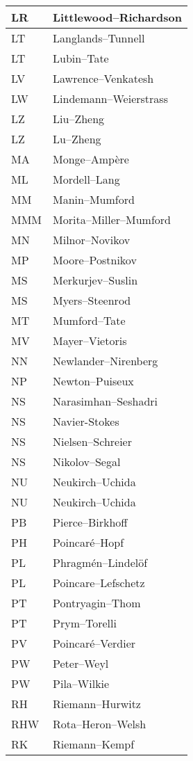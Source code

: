 \documentclass{amsart}
\numberwithin{equation}{section}
\theoremstyle{plain}
\numberwithin{equation}{section}
\theoremstyle{remark}
\begin{document}
\begin{multicols}{2}
{\begin{longtable}{l|l}
LR & Littlewood--Richardson\\ \hline
LT & Langlands--Tunnell\\ \hline
LT & Lubin--Tate\\ \hline
LV & Lawrence--Venkatesh\\ \hline
LW & Lindemann--Weierstrass\\ \hline
LZ & Liu--Zheng\\ \hline
LZ & Lu--Zheng\\ \hline
MA & Monge--Ampère\\ \hline
ML & Mordell--Lang\\ \hline
MM & Manin--Mumford\\ \hline
MMM & Morita--Miller--Mumford\\ \hline
MN & Milnor--Novikov\\ \hline
MP & Moore--Postnikov\\ \hline
MS & Merkurjev--Suslin\\ \hline
MS & Myers--Steenrod\\ \hline
MT & Mumford--Tate\\ \hline
MV & Mayer--Vietoris\\ \hline
NN & Newlander--Nirenberg\\ \hline
NP & Newton--Puiseux\\ \hline
NS & Narasimhan--Seshadri\\ \hline
NS & Navier-Stokes\\ \hline
NS & Nielsen--Schreier\\ \hline
NS & Nikolov--Segal\\ \hline
NU & Neukirch--Uchida\\ \hline
NU & Neukirch--Uchida\\ \hline
PB & Pierce--Birkhoff\\ \hline
PH & Poincaré--Hopf\\ \hline
PL & Phragmén--Lindelöf\\ \hline
PL & Poincare--Lefschetz\\ \hline
PT & Pontryagin--Thom\\ \hline
PT & Prym--Torelli\\ \hline
PV & Poincaré--Verdier\\ \hline
PW & Peter--Weyl\\ \hline
PW & Pila--Wilkie\\ \hline
RH & Riemann--Hurwitz\\ \hline
RHW & Rota--Heron--Welsh\\ \hline
RK & Riemann--Kempf\\ \hline

\end{longtable}}
\end{multicols}
\end{document}
